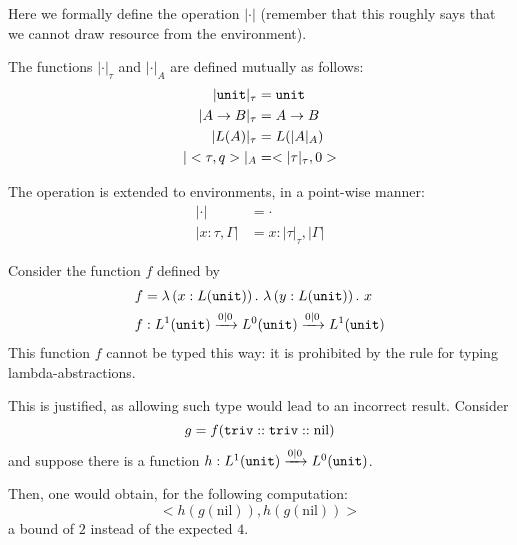 \documentclass[ manuscript,screen, nonacm]{acmart}
\begin{document}
Here we formally define the operation \(|\cdot|\) (remember that this roughly says that we cannot draw resource from the environment).
\begin{definition}[\(|\cdot|\)]
  The functions \(|\cdot|_\tau\) and \(|\cdot|_A\) are defined mutually as follows:
  \begin{align*}
      |\unitc|_\tau &= \unitc \\
      |A \rightarrow B|_\tau &= A \rightarrow B\\
      |L(A)|_\tau &= L(|A|_A)\\
      |<\tau,q>|_A &= <|\tau|_\tau, 0>
  \end{align*}

  The operation is extended to environments, in a point-wise manner:
  \begin{align*}
      |\cdot| &= \cdot\\
      |x:\tau, \Gamma| &= x : |\tau|_\tau, |\Gamma|
  \end{align*}
\end{definition}

\begin{example}
    Consider the function \(f\) defined by
    \begin{align*}
    f &= \lambda\left(x:L(\mathtt{unit})\right).~\lambda\left(y:L(\mathtt{unit})\right).~x\\
    f &: L^1(\mathtt{unit}) \xrightarrow{0|0} L^0(\mathtt{unit}) \xrightarrow{0|0} L^1(\mathtt{unit})
    \end{align*}
    This function \(f\) cannot be typed this way: it is prohibited by the rule for
    typing lambda-abstractions.
    
    This is justified, as allowing such type would lead to an incorrect result.
    Consider
    \[
    g = f(\mathtt{triv} :: \mathtt{triv} :: \mathrm{nil})
    \]
    and suppose there is a function \(h : L^1(\mathtt{unit}) \xrightarrow{0 | 0} L^0(\mathtt{unit})\).
    
    Then, one would obtain, for the following computation:
    \[
    < h(g(\mathrm{nil})), h(g(\mathrm{nil})) >
    \]
    a bound of \(2\) instead of the expected \(4\).
\end{example}
\end{document}
